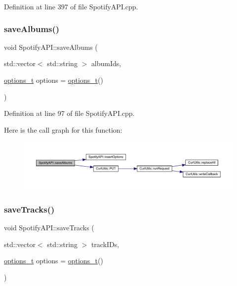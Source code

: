 Definition at line 397 of file Spotify\+A\+P\+I.\+cpp.

\mbox{\label{class_spotify_a_p_i_abcf8490d7729c7c620fbdc42faf94c3a}} 
\subsubsection{\texorpdfstring{save\+Albums()}{saveAlbums()}}
{\footnotesize\ttfamily void Spotify\+A\+P\+I\+::save\+Albums (\begin{DoxyParamCaption}\item[{std\+::vector$<$ std\+::string $>$}]{album\+Ids,  }\item[{\mbox{\hyperlink{_spotify_a_p_i_8h_a0ff5cac1a4007bb330b7d9939650c283}{options\+\_\+t}}}]{options = {\ttfamily \mbox{\hyperlink{_spotify_a_p_i_8h_a0ff5cac1a4007bb330b7d9939650c283}{options\+\_\+t}}()} }\end{DoxyParamCaption})}



Definition at line 97 of file Spotify\+A\+P\+I.\+cpp.

Here is the call graph for this function\+:
\nopagebreak
\begin{figure}[H]
\begin{center}
\leavevmode
\includegraphics[width=350pt]{class_spotify_a_p_i_abcf8490d7729c7c620fbdc42faf94c3a_cgraph}
\end{center}
\end{figure}
\mbox{\label{class_spotify_a_p_i_a385e1e97af9b2f8b22ac0538c6f410a1}} 
\subsubsection{\texorpdfstring{save\+Tracks()}{saveTracks()}}
{\footnotesize\ttfamily void Spotify\+A\+P\+I\+::save\+Tracks (\begin{DoxyParamCaption}\item[{std\+::vector$<$ std\+::string $>$}]{track\+I\+Ds,  }\item[{\mbox{\hyperlink{_spotify_a_p_i_8h_a0ff5cac1a4007bb330b7d9939650c283}{options\+\_\+t}}}]{options = {\ttfamily \mbox{\hyperlink{_spotify_a_p_i_8h_a0ff5cac1a4007bb330b7d9939650c283}{options\+\_\+t}}()} }\end{DoxyParamCaption})}



